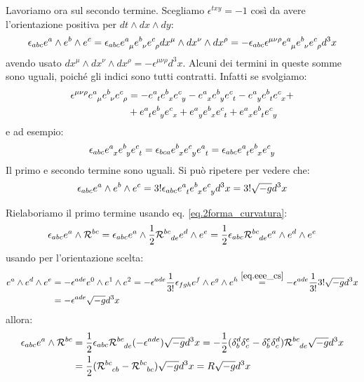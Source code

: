 Lavoriamo ora sul secondo termine. Scegliamo $\epsilon^{txy} = -1$ così da avere l'orientazione positiva per $dt\wedge dx\wedge dy$:
\begin{equation*}
    \epsilon_{abc}e^a \wedge e^b \wedge e^c = \epsilon_{abc}\tensor{e}{^a_\mu}\tensor{e}{^b_\nu}\tensor{e}{^c_\rho} dx^\mu\wedge dx^\nu\wedge dx^\rho = - \epsilon_{abc}\epsilon^{\mu\nu\rho}\tensor{e}{^a_\mu}\tensor{e}{^b_\nu}\tensor{e}{^c_\rho}  d^3x
\end{equation*}
avendo usato $dx^\mu\wedge dx^\nu \wedge dx^\rho = -\epsilon^{\mu\nu\rho}d^3x$. Alcuni dei termini in queste somme sono uguali, poiché gli indici sono tutti contratti. Infatti se svolgiamo:
\begin{align*}
\epsilon^{\mu\nu\rho}\tensor{e}{^a_\mu}\tensor{e}{^b_\nu}\tensor{e}{^c_\rho} &= - \tensor{e}{^a_t}\tensor{e}{^b_x}\tensor{e}{^c_y} - \tensor{e}{^a_x}\tensor{e}{^b_y}\tensor{e}{^c_t} - \tensor{e}{^a_y}\tensor{e}{^b_t}\tensor{e}{^c_x} + \\ &+ \tensor{e}{^a_t}\tensor{e}{^b_y}\tensor{e}{^c_x} + \tensor{e}{^a_y}\tensor{e}{^b_x}\tensor{e}{^c_t} + \tensor{e}{^a_x}\tensor{e}{^b_t}\tensor{e}{^c_y} \end{align*}
e ad esempio:
\begin{equation*}
    \epsilon_{abc}\tensor{e}{^a_x}\tensor{e}{^b_y}\tensor{e}{^c_t} = \epsilon_{bca}\tensor{e}{^b_x}\tensor{e}{^c_y}\tensor{e}{^a_t} = \epsilon_{abc}\tensor{e}{^a_t}\tensor{e}{^b_x}\tensor{e}{^c_y}
\end{equation*}
Il primo e secondo termine sono uguali. Si può ripetere per vedere che:
\begin{equation}
    \epsilon_{abc} e^a\wedge e^b \wedge e^c = 3! \epsilon_{abc}\tensor{e}{^a_t}\tensor{e}{^b_x}\tensor{e}{^c_y} d^3x = 3! \sqrt{-g}d^3x
    \label{eq.eee_cs}
\end{equation}

Rielaboriamo il primo termine usando eq. \ref{eq.2forma_curvatura}:
\begin{equation*}
    \epsilon_{abc} e^a \wedge \mathcal R^{bc} = \epsilon_{abc}e^a\wedge \frac{1}{2}\tensor{\mathcal R}{^{bc}_{de}}e^d\wedge e^e = \frac{1}{2}\epsilon_{abc}\tensor{\mathcal R}{^{bc}_{de}} e^a\wedge e^d\wedge e^e
\end{equation*}
usando per l'orientazione scelta:
\begin{align*}
    e^a \wedge e^d \wedge e^e &= - \epsilon^{ade}e^0\wedge e^1 \wedge e^2 = - \epsilon^{ade}\frac{1}{3!}\epsilon_{fgh}e^f \wedge e^g \wedge e^h \overset{\ref{eq.eee_cs}}{=} - \epsilon^{ade}\frac{1}{3!}3!\sqrt{-g}d^3x \\ &= - \epsilon^{ade}\sqrt{-g}d^3x     
\end{align*}
allora:
\begin{align*}
    \epsilon_{abc} e^a \wedge \mathcal R^{bc} &= \frac{1}{2}\epsilon_{abc}\tensor{\mathcal R}{^{bc}_{de}}(-\epsilon^{ade})\sqrt{-g}d^3x = -\frac{1}{2}(\delta^d_b\delta^e_c - \delta^e_b\delta^d_c)\tensor{\mathcal R}{^{bc}_{de}}\sqrt{-g}d^3x \\
    &= \frac{1}{2}(\tensor{\mathcal R}{^{bc}_{cb}} - \tensor{\mathcal R}{^{bc}_{bc}})\sqrt{-g}d^3x = R\sqrt{-g}d^3x
\end{align*}

